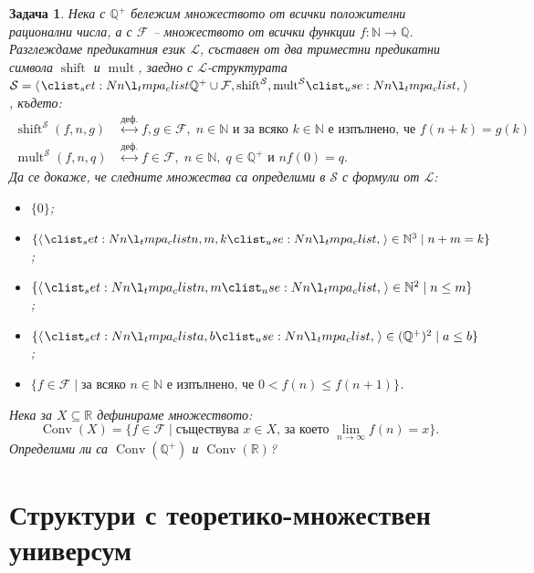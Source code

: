 \documentclass[12pt]{article}
\newcommand{\N}{\mathbb{N}}
\newcommand{\Q}{\mathbb{Q}}
\newcommand{\R}{\mathbb{R}}
\newcommand{\calS}{\mathcal{S}}
\newcommand{\calL}{\mathcal{L}}
\newcommand{\calF}{\mathcal{F}}
\newcommand{\dequiv}{\stackrel{\text{деф.}}{\longleftrightarrow}}
\newtheorem{problem}{Задача}[section]
\theoremstyle{definition}
\begin{document}
\begin{problem}
Нека с $\Q^+$ бележим множеството от всички положителни рационални числа, а с $\calF$ -- множеството от всички функции $f : \N \rightarrow \Q$.
Разглеждаме предикатния език $\calL$, съставен от два триместни предикатни символа $\operatorname{shift}$ и $\operatorname{mult}$, заедно с $\calL$-структурата $\calS = \opair{\Q^+ \cup \calF, \operatorname{shift}^{\calS}, \operatorname{mult}^{\calS}}$, където:
\begin{align*}
    \operatorname{shift}^\calS(f, n, g) & \dequiv f, g \in \calF, \; n \in \N \text{ и за всяко } k \in \N \text{ е изпълнено, че } f(n + k) = g(k) \\
    \operatorname{mult}^\calS(f, n, q)  & \dequiv f \in \calF, \; n \in \N, \; q \in \Q^+ \text{ и } n f(0) = q.
\end{align*}
Да се докаже, че следните множества са определими в $\calS$ с формули от $\calL$:
\begin{itemize}
    \item[а)] $\{ 0 \}$;
    \item[б)] $\{ \opair{n, m, k} \in \N^3 \mid n + m = k \}$;
    \item[в)] $\{ \opair{n, m} \in \N^2 \mid n \leq m \}$;
    \item[г)] $\{ \opair{a, b} \in (\Q^+)^2 \mid a \leq b \}$;
    \item[д)] $\{ f \in \calF \mid \text{за всяко } n \in \N \text{ е изпълнено, че } 0 < f(n) \leq f(n + 1) \}$.
\end{itemize}
Нека за $X \subseteq \R$ дефинираме множеството:
\[
    \operatorname{Conv}(X) = \{ f \in \calF \mid \text{съществува } x \in X \text{, за което } \lim\limits_{n \to \infty} f(n) = x \}.
\]
Определими ли са $\operatorname{Conv}(\Q^+)$ и $\operatorname{Conv}(\R)$?
\end{problem}

\section{Структури с теоретико-множествен универсум}
\end{document}
